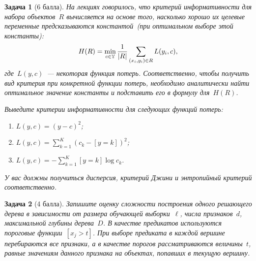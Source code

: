 \documentclass[12pt,fleqn]{article}
\newtheorem{esProblem}{Задача}
\begin{document}
\begin{esProblem}[6 балла]
    На лекциях говорилось, что критерий информативности для набора объектов~$R$ вычисляется на основе того,
    насколько хорошо их целевые переменные предсказываются константой~(при оптимальном выборе этой константы):
    \[
        H(R)
        =
        \min_{c \in \mathbb{Y}}
        \frac{1}{|R|}
        \sum_{(x_i, y_i) \in R}
            L(y_i, c),
    \]
    где~$L(y, c)$~--- некоторая функция потерь.
    Соответственно, чтобы получить вид критерия при конкретной функции потерь, необходимо аналитически
    найти оптимальное значение константы и подставить его в формулу для~$H(R)$.

    Выведите критерии информативности для следующих функций потерь:
    \begin{enumerate}
        \item $L(y, c) = (y - c)^2$;
        \item $L(y, c) = \sum_{k = 1}^{K} (c_k - [y = k])^2$;
        \item $L(y, c) = -\sum_{k = 1}^{K} [y = k] \log c_k$.
    \end{enumerate}
    У вас должны получиться дисперсия, критерий Джини и энтропийный критерий соответственно.
\end{esProblem}

\begin{esProblem}[4 балла]
    Запишите оценку сложности построения одного решающего дерева в зависимости
    от размера обучающей выборки~$\ell$, числа признаков~$d$, максимальной глубины дерева~$D$.
    В качестве предикатов используются пороговые функции~$[x_j > t]$.
    При выборе предиката в каждой вершине перебираются все признаки,
    а в качестве порогов рассматриваются величины~$t$, равные значениям данного признака
    на объектах, попавших в текущую вершину.
\end{esProblem}
\end{document}

